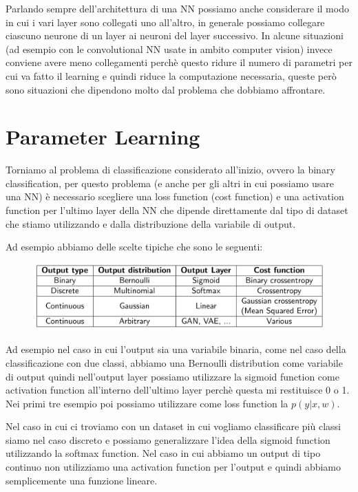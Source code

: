 \documentclass[14pt]{extreport}
\begin{document}
Parlando sempre dell'architettura di una NN possiamo anche considerare il modo in cui i vari layer sono collegati uno all'altro, in generale possiamo
collegare ciascuno neurone di un layer ai neuroni del layer successivo. In alcune situazioni (ad esempio con le convolutional NN usate in ambito
computer vision) invece conviene avere meno collegamenti perchè questo ridure il numero di parametri per cui va fatto il learning e quindi riduce la
computazione necessaria, queste però sono situazioni che dipendono molto dal problema che dobbiamo affrontare.

\section{Parameter Learning}

Torniamo al problema di classificazione considerato all'inizio, ovvero la binary classification, per questo problema (e anche per gli altri in cui
possiamo usare una NN) è necessario scegliere una loss function (cost function) e una activation function per l'ultimo layer della NN che dipende
direttamente dal tipo di dataset che stiamo utilizzando e dalla distribuzione della variabile di output.

Ad esempio abbiamo delle scelte tipiche che sono le seguenti:

\begin{figure}[H]
	\centering
	\includegraphics[width=0.7\linewidth]{373.jpeg}
\end{figure}

Ad esempio nel caso in cui l'output sia una variabile binaria, come nel caso della classificazione con due classi, abbiamo una Bernoulli distribution
come variabile di output quindi nell'output layer possiamo utilizzare la sigmoid function come activation function all'interno dell'ultimo layer
perchè questa mi restituisce 0 o 1. Nei primi tre esempio poi possiamo utilizzare come loss function la $p(y|x,w)$.

Nel caso in cui ci troviamo con un dataset in cui vogliamo classificare più classi siamo nel caso discreto e possiamo generalizzare l'idea della
sigmoid function utilizzando la softmax function. Nel caso in cui abbiamo un output di tipo continuo non utilizziamo una activation function per
l'output e quindi abbiamo semplicemente una funzione lineare.
\end{document}
